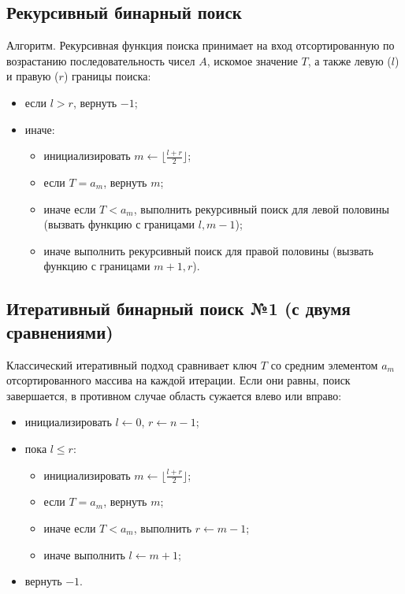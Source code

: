 \documentclass[14pt,a4paper]{extarticle}
\begin{document}
\subsection{Рекурсивный бинарный поиск}
Алгоритм. Рекурсивная функция поиска принимает на вход отсортированную по возрастанию последовательность чисел $A$, искомое значение $T$, а также левую ($l$) и правую ($r$) границы поиска:
\begin{itemize}
\item если $l > r$, вернуть $-1$;
\item иначе:
  \begin{itemize}
  \item инициализировать $m \leftarrow \lfloor\frac{l+r}{2}\rfloor$;
  \item если $T = a_m$, вернуть $m$;
  \item иначе если $T < a_m$, выполнить рекурсивный поиск для левой половины (вызвать функцию с границами $l, m-1$);
  \item иначе выполнить рекурсивный поиск для правой половины (вызвать функцию с границами $m+1, r$).
  \end{itemize}
\end{itemize}

\subsection{Итеративный бинарный поиск №1 (с двумя сравнениями)}
Классический итеративный подход сравнивает ключ $T$ со средним элементом $a_m$ отсортированного массива на каждой итерации. Если они равны, поиск завершается, в противном случае область сужается влево или вправо:
\begin{itemize}
\item инициализировать $l \leftarrow 0$, $r \leftarrow n-1$;
\item пока $l \le r$:
  \begin{itemize}
  \item инициализировать $m \leftarrow \lfloor\frac{l+r}{2}\rfloor$;
  \item если $T = a_m$, вернуть $m$;
  \item иначе если $T < a_m$, выполнить $r \leftarrow m-1$;
  \item иначе выполнить $l \leftarrow m+1$;
  \end{itemize}
\item вернуть $-1$.
\end{itemize}
\end{document}
